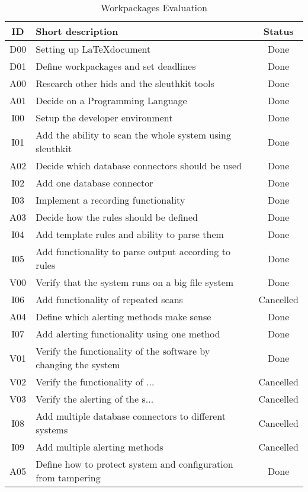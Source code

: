 \begin{table}[!ht]
  \begin{center}
    \caption{Workpackages Evaluation}
    \label{tab:workpackages:evaluation}
    \begin{tabular}{c|l|c}
      \textbf{ID} & \textbf{Short description} & \textbf{Status} \\
      \hline
		D00 & Setting up \LaTeX document & Done \\
		D01 & Define workpackages and set deadlines & Done \\
		A00 & Research other \gls{hids} and the sleuthkit tools & Done \\
		A01 & Decide on a Programming Language & Done \\
		I00 & Setup the developer environment & Done \\
		I01 & Add the ability to scan the whole system using sleuthkit & Done \\
		A02 & Decide which database connectors should be used & Done \\
		I02 & Add one database connector & Done \\
		I03 & Implement a recording functionality & Done \\
		A03 & Decide how the rules should be defined & Done \\
		I04 & Add template rules and ability to parse them & Done \\
		I05 & Add functionality to parse output according to rules & Done \\
		V00 & Verify that the system runs on a big file system & Done \\
		I06 & Add functionality of repeated scans & Cancelled \\
		A04 & Define which alerting methods make sense & Done \\ 
		I07 & Add alerting functionality using one method & Done \\
		V01 & Verify the functionality of the software by changing the system & Done \\
		V02 & Verify the functionality of ... & Cancelled \\
		V03 & Verify the alerting of the s... & Cancelled \\
		I08 & Add multiple database connectors to different systems & Cancelled \\
		I09 & Add multiple alerting methods & Cancelled \\
		A05 & Define how to protect system and configuration from tampering & Done \\

\end{tabular}
\end{center}
\end{table}
